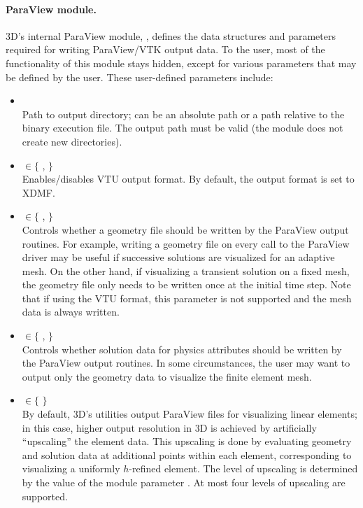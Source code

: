 \paragraph{ParaView module.}
\hp3D's internal ParaView module, , defines the data structures and parameters required for writing ParaView/VTK output data. To the user, most of the functionality of this module stays hidden, except for various parameters that may be defined by the user. These user-defined parameters include:
\begin{itemize}
	\item {}\\
	Path to output directory; can be an absolute path or a path relative to the binary execution file. The output path must be valid (the module does not create new directories).
	\item {} $\in \{$ ,  $\}$\\
	Enables/disables VTU output format. By default, the output format is set to XDMF.
	\item {} $\in \{$ ,  $\}$\\
	Controls whether a geometry file should be written by the ParaView output routines. For example, writing a geometry file on every call to the ParaView driver may be useful if successive solutions are visualized for an adaptive mesh. On the other hand, if visualizing a transient solution on a fixed mesh, the geometry file only needs to be written once at the initial time step. Note that if using the VTU format, this parameter is not supported and the mesh data is always written.
	\item {} $\in \{$ ,  $\}$\\
	Controls whether solution data for physics attributes should be written by the ParaView output routines. In some circumstances, the user may want to output only the geometry data to visualize the finite element mesh.
	\item {} $\in \{$  $\}$\\
	By default, \hp3D's utilities output ParaView files for visualizing linear elements; in this case, higher output resolution in \hp3D is achieved by artificially ``upscaling'' the element data. This upscaling is done by evaluating geometry and solution data at additional points within each element, corresponding to visualizing a uniformly $h$-refined element. The level of upscaling is determined by the value of the  module parameter . At most four levels of upscaling are supported.

\end{itemize}
